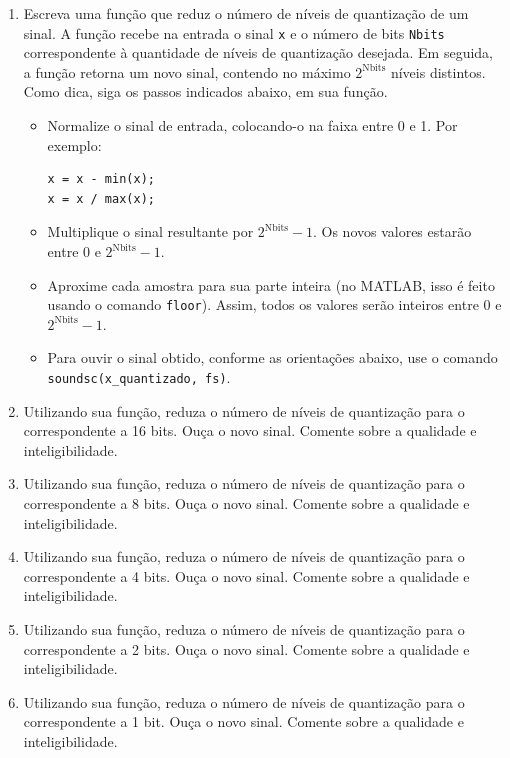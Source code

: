 \documentclass[12pt,a4paper]{article}
\begin{document}
\begin{enumerate}
  \item Escreva uma função que reduz o número de níveis de quantização de um sinal. A função
        recebe na entrada o sinal \texttt{x} e o número de bits \texttt{Nbits} correspondente à
        quantidade de níveis de quantização desejada. Em seguida, a função retorna um novo sinal,
        contendo no máximo $2^{\text{Nbits}}$ níveis distintos. Como dica, siga os passos indicados
        abaixo, em sua função.
        \begin{itemize}
          \item Normalize o sinal de entrada, colocando-o na faixa entre 0 e 1. Por exemplo:
\begin{lstlisting}
x = x - min(x);
x = x / max(x);
\end{lstlisting}
          \item Multiplique o sinal resultante por $2^{\text{Nbits}} - 1$. Os novos valores estarão
                entre 0 e $2^{\text{Nbits}} - 1$.
          \item Aproxime cada amostra para sua parte inteira (no MATLAB, isso é feito usando o
                comando \texttt{floor}). Assim, todos os valores serão inteiros entre 0 e
                $2^{\text{Nbits}} - 1$.
          \item Para ouvir o sinal obtido, conforme as orientações abaixo, use o comando
                \texttt{soundsc(x\_quantizado, fs)}.
        \end{itemize}

  \item Utilizando sua função, reduza o número de níveis de quantização para o correspondente a
        16 bits. Ouça o novo sinal. Comente sobre a qualidade e inteligibilidade.

  \item Utilizando sua função, reduza o número de níveis de quantização para o correspondente a
        8 bits. Ouça o novo sinal. Comente sobre a qualidade e inteligibilidade.

  \item Utilizando sua função, reduza o número de níveis de quantização para o correspondente a
        4 bits. Ouça o novo sinal. Comente sobre a qualidade e inteligibilidade.

  \item Utilizando sua função, reduza o número de níveis de quantização para o correspondente a
        2 bits. Ouça o novo sinal. Comente sobre a qualidade e inteligibilidade.

  \item Utilizando sua função, reduza o número de níveis de quantização para o correspondente a
        1 bit. Ouça o novo sinal. Comente sobre a qualidade e inteligibilidade.
\end{enumerate}
\end{document}
